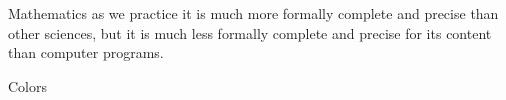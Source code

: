 
\begin{plQuote}
{}{}%
{Mathematics as we practice it is much more formally 
complete and precise than
other sciences, but it is much less formally complete and precise 
for its content than computer programs.
}
\end{plQuote}

\begin{plSection}{Colors}

\begin{plPlot}{}{}{}
\end{plPlot}
\begin{plTable}{}{}{}
\end{plTable}
\begin{plQuote}{}{}{}
\end{plQuote}
\begin{plAlgorithm}{}{}{}
\end{plAlgorithm}
\begin{plListing}{}{}{}
\end{plListing}
\begin{plScreen}{}{}{}
\end{plScreen}

\begin{plNote}{}{}{}
\end{plNote}
\begin{plExercise}{}{}{}
\end{plExercise}

\begin{plDefinition}{}{}{}
\end{plDefinition}
\begin{plExample}{}{}{}
\end{plExample}
\begin{plAxiom}{}{}{}
\end{plAxiom}
\begin{plAxiomSchema}{}{}{}
\end{plAxiomSchema}
\begin{plLemma}{}{}{}
\end{plLemma}
\begin{plTheorem}{}{}{}
\end{plTheorem}
\begin{plCorollary}{}{}{}
\end{plCorollary}
\begin{plDiagram}{}{}{}
\end{plDiagram}

\end{plSection}%
